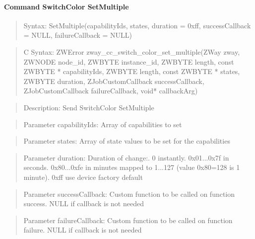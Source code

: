 \paragraph{Command SwitchColor SetMultiple}
\begin{quote}Syntax: SetMultiple(capabilityIds, states, duration = 0xff, successCallback = NULL, failureCallback = NULL)\end{quote}
\begin{quote}C Syntax: ZWError zway\_cc\_switch\_color\_set\_multiple(ZWay zway, ZWNODE node\_id, ZWBYTE instance\_id, ZWBYTE length, const ZWBYTE * capabilityIds, ZWBYTE length, const ZWBYTE * states, ZWBYTE duration, ZJobCustomCallback successCallback, ZJobCustomCallback failureCallback, void* callbackArg)\end{quote}
\begin{quote}Description: Send SwitchColor SetMultiple\end{quote}
\begin{quote}Parameter capabilityIds: Array of capabilities to set\end{quote}
\begin{quote}Parameter states: Array of state values to be set for the capabilities\end{quote}
\begin{quote}Parameter duration: Duration of change:. 0 instantly. 0x01...0x7f in seconds. 0x80...0xfe in minutes mapped to 1...127 (value 0x80=128 is 1 minute). 0xff use device factory default\end{quote}
\begin{quote}Parameter successCallback: Custom function to be called on function success. NULL if callback is not needed\end{quote}
\begin{quote}Parameter failureCallback: Custom function to be called on function failure. NULL if callback is not needed\end{quote}


